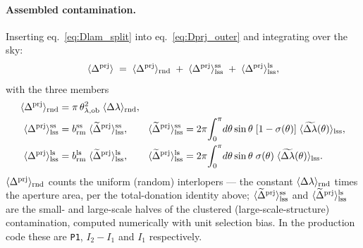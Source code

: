 \documentclass[a4paper, 11pt]{article}
\newcommand{\dprj}{\Delta^{\rm prj}}
\newcommand{\thob}{\theta_{\lambda,{\rm ob}}}
\newcommand{\brmss}{b_{\rm rm}^{\rm ss}}
\newcommand{\brmls}{b_{\rm rm}^{\rm ls}}
\newcommand{\Dp}{\langle \dprj\rangle}
\newcommand{\Dlrnd}{\langle \Delta\lambda\rangle_{\rm rnd}}
\newcommand{\tDllss}[1]{\langle \widetilde{\Delta\lambda}(#1)\rangle_{\rm lss}}
\newcommand{\Dprnd}{\langle \dprj\rangle_{\rm rnd}}
\newcommand{\Dpss}{\langle \dprj\rangle^{\rm ss}_{\rm lss}}
\newcommand{\Dpls}{\langle \dprj\rangle^{\rm ls}_{\rm lss}}
\newcommand{\tDpss}{\langle \widetilde{\Delta}^{\rm prj}\rangle^{\rm ss}_{\rm lss}}
\newcommand{\tDpls}{\langle \widetilde{\Delta}^{\rm prj}\rangle^{\rm ls}_{\rm lss}}
\begin{document}
\paragraph{Assembled contamination.} Inserting
eq.~\eqref{eq:Dlam_split} into eq.~\eqref{eq:Dprj_outer} and
integrating over the sky:
\begin{equation}
\Dp \;=\; \Dprnd
\;+\; \Dpss
\;+\; \Dpls,
\label{eq:Dprj_split}
\end{equation}
with the three members
\begin{align}
\Dprnd
&= \pi\,\thob^2\; \Dlrnd,
\label{eq:Dprj_rnd}\\
\Dpss
&= \brmss\; \tDpss,
\qquad
\tDpss
= 2\pi\!\int_0^\pi\! d\theta\sin\theta\;
[1-\sigma(\theta)]\; \tDllss{\theta},
\label{eq:Dprj_ss}\\
\Dpls
&= \brmls\; \tDpls,
\qquad
\tDpls
= 2\pi\!\int_0^\pi\! d\theta\sin\theta\;
\sigma(\theta)\; \tDllss{\theta}.
\label{eq:Dprj_ls}
\end{align}
$\Dprnd$ counts the uniform (random) interlopers --- the constant
$\Dlrnd$ times the aperture area, per the total-donation identity
above; $\tDpss$ and $\tDpls$ are the small- and large-scale
halves of the clustered (large-scale-structure) contamination,
computed numerically with unit selection bias. In the production
code these are \texttt{P1}, $I_2-I_1$ and $I_1$ respectively.
\end{document}
